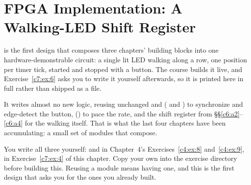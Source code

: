 \section{FPGA Implementation: A Walking-LED Shift Register}
\label{c7:a5}
 is the first design that composes three chapters' building blocks into one
hardware-demonstrable circuit: a single lit LED walking along a row, one position per timer tick,
started and stopped with a button. The course builds it live, and Exercise~\ref{c7:ex:6} asks you
to write it yourself afterwards, so it is printed here in full rather than shipped as a file.

It writes almost no new logic, reusing unchanged  and 
( and ) to synchronize and edge-detect the button, 
() to pace the rate, and the shift register from \S\S\ref{c6:a2}--\ref{c6:a4} for
the walking itself. That is what the last four chapters have been accumulating: a small set of
modules that compose.

You write all three yourself:  and  in Chapter~4's
Exercises~\ref{c4:ex:8} and~\ref{c4:ex:9},  in Exercise~\ref{c7:ex:4} of this chapter.
Copy your own into the exercise directory before building this. Reusing a module means having one,
and this is the first design that asks you for the ones you already built.

